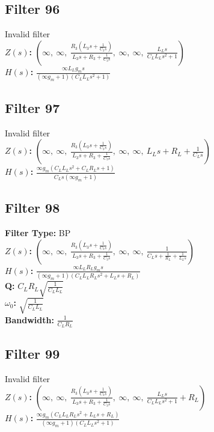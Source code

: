 \documentclass{article}
\begin{document}
\subsection*{Filter 96}
Invalid filter \\ 
\textbf{$Z(s)$:} $\left( \infty, \  \infty, \  \frac{R_{3} \left(L_{3} s + \frac{1}{C_{3} s}\right)}{L_{3} s + R_{3} + \frac{1}{C_{3} s}}, \  \infty, \  \infty, \  \frac{L_{L} s}{C_{L} L_{L} s^{2} + 1}\right)$ \\ 
\textbf{$H(s)$:} $\frac{\infty L_{L} g_{m} s}{\left(\infty g_{m} + 1\right) \left(C_{L} L_{L} s^{2} + 1\right)}$ \\ 
\subsection*{Filter 97}
Invalid filter \\ 
\textbf{$Z(s)$:} $\left( \infty, \  \infty, \  \frac{R_{3} \left(L_{3} s + \frac{1}{C_{3} s}\right)}{L_{3} s + R_{3} + \frac{1}{C_{3} s}}, \  \infty, \  \infty, \  L_{L} s + R_{L} + \frac{1}{C_{L} s}\right)$ \\ 
\textbf{$H(s)$:} $\frac{\infty g_{m} \left(C_{L} L_{L} s^{2} + C_{L} R_{L} s + 1\right)}{C_{L} s \left(\infty g_{m} + 1\right)}$ \\ 
\subsection*{Filter 98}
\textbf{Filter Type:} BP \\ 
\textbf{$Z(s)$:} $\left( \infty, \  \infty, \  \frac{R_{3} \left(L_{3} s + \frac{1}{C_{3} s}\right)}{L_{3} s + R_{3} + \frac{1}{C_{3} s}}, \  \infty, \  \infty, \  \frac{1}{C_{L} s + \frac{1}{R_{L}} + \frac{1}{L_{L} s}}\right)$ \\ 
\textbf{$H(s)$:} $\frac{\infty L_{L} R_{L} g_{m} s}{\left(\infty g_{m} + 1\right) \left(C_{L} L_{L} R_{L} s^{2} + L_{L} s + R_{L}\right)}$ \\ 
\textbf{Q:} $C_{L} R_{L} \sqrt{\frac{1}{C_{L} L_{L}}}$ \\ 
\textbf{$\omega_0$:} $\sqrt{\frac{1}{C_{L} L_{L}}}$ \\ 
\textbf{Bandwidth:} $\frac{1}{C_{L} R_{L}}$ \\ 
\subsection*{Filter 99}
Invalid filter \\ 
\textbf{$Z(s)$:} $\left( \infty, \  \infty, \  \frac{R_{3} \left(L_{3} s + \frac{1}{C_{3} s}\right)}{L_{3} s + R_{3} + \frac{1}{C_{3} s}}, \  \infty, \  \infty, \  \frac{L_{L} s}{C_{L} L_{L} s^{2} + 1} + R_{L}\right)$ \\ 
\textbf{$H(s)$:} $\frac{\infty g_{m} \left(C_{L} L_{L} R_{L} s^{2} + L_{L} s + R_{L}\right)}{\left(\infty g_{m} + 1\right) \left(C_{L} L_{L} s^{2} + 1\right)}$ \\ 
\end{document}

